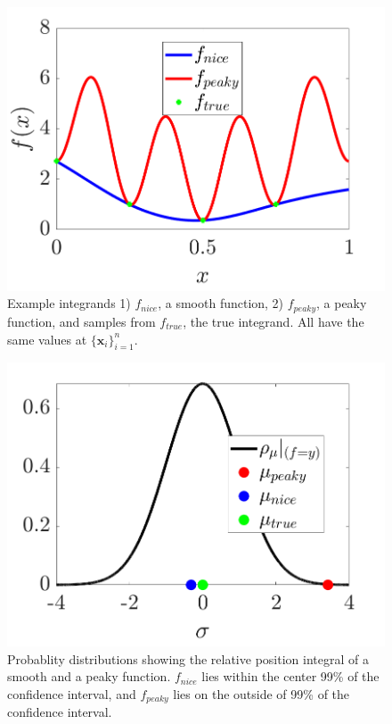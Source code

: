 \documentclass{iitthesis}          %
\newcommand{\bm}[1]{\boldsymbol{#1}}
\newcommand{\vx}{\bm{x}}
\newcommand{\JRNote}[1]{{\textcolor{green}{JR: #1}}}
\begin{document}
\begin{figure}[ht]
	\centering
	\includegraphics[width=0.9\linewidth]{cone_bayes_f_real}
	\caption{Example integrands 1) $f_{nice}$, a smooth function, 2) $f_{peaky}$, a peaky function, and samples from $f_{true}$, the true integrand. All have the same values at $\{\vx_i\}_{i=1}^n$.}
	\label{fig:cone_bayes_functions}
\end{figure}
\begin{figure}[ht]
	\centering
	\includegraphics[width=0.9\linewidth]{cone_bayes_mu_pdf}
	\caption{Probablity distributions showing the relative position integral of a smooth and a peaky function. $f_{nice}$ lies within the center 99\% of the confidence interval, and $f_{peaky}$ lies on the outside of 99\% of  the confidence interval.}
	\label{fig:cone_bayes_posterior}
\end{figure}
\end{document}
